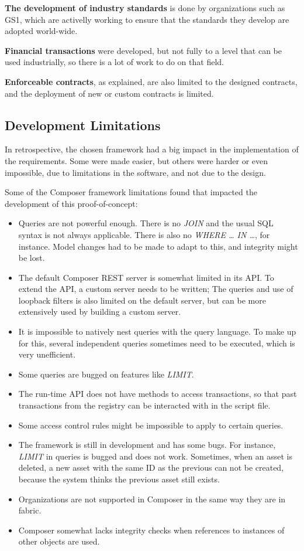 \textbf{The development of industry standards} is done by organizations such as GS1, which are activelly working to ensure that the standards they develop are adopted world-wide.

\textbf{Financial transactions} were developed, but not fully to a level that can be used industrially, so there is a lot of work to do on that field.

\textbf{Enforceable contracts}, as explained, are also limited to the designed contracts, and the deployment of new or custom contracts is limited.


\subsection{Development Limitations}

In retrospective, the chosen framework had a big impact in the implementation of the requirements. Some were made easier, but others were harder or even impossible, due to limitations in the software, and not due to the design.

Some of the Composer framework limitations found that impacted the development of this proof-of-concept:
\begin{itemize}
	\item  Queries are not powerful enough. There is no \textit{JOIN} and the usual SQL syntax is not always applicable. There is also no \textit{WHERE … IN …}, for instance. Model changes had to be made to adapt to this, and integrity might be lost.
	\item The default Composer REST server is somewhat limited in its API. To extend the API, a custom server needs to be written; The queries and use of loopback filters is also limited on the default server, but can be more extensively used by building a custom server.
	\item It is impossible to natively nest queries with the query language. To make up for this, several independent queries sometimes need to be executed, which is very unefficient.
	\item Some queries are bugged on features like \textit{LIMIT}.
	\item The run-time API does not have methods to access transactions, so that past transactions from the registry can be interacted with in the script file.
	\item Some access control rules might be impossible to apply to certain queries. 
	\item The framework is still in development and has some bugs. For instance, \textit{LIMIT} in queries is bugged and does not work. Sometimes, when an asset is deleted, a new asset with the same ID as the previous can not be created, because the system thinks the previous asset still exists.
	\item Organizations are not supported in Composer in the same way they are in fabric.
	\item Composer somewhat lacks integrity checks when references to instances of other objects are used.
\end{itemize}
